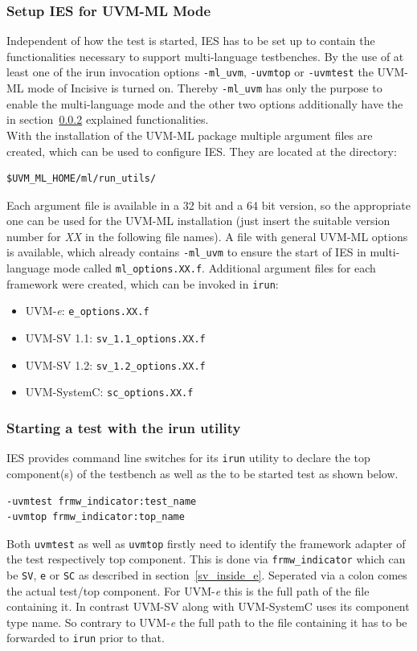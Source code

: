 \subsubsection{Setup IES for UVM-ML Mode}
Independent of how the test is started, IES has to be set up to contain the functionalities necessary to support multi-language testbenches. By the use of at least one of the irun invocation options \lstinline$-ml_uvm$, \lstinline$-uvmtop$ or \lstinline$-uvmtest$ the UVM-ML mode of Incisive is turned on. Thereby \lstinline$-ml_uvm$ has only the purpose to enable the multi-language mode and the other two options additionally have the in section~\ref{uvm_top} explained functionalities.\\
With the installation of the UVM-ML package multiple argument files are created, which can be used to configure IES. They are located at the directory:
\begin{lstlisting}
$UVM_ML_HOME/ml/run_utils/
\end{lstlisting}
Each argument file is available in a 32 bit and a 64 bit version, so the appropriate one can be used for the UVM-ML installation (just insert the suitable version number for \emph{XX} in the following file names). A file with general UVM-ML options is available, which already contains \lstinline$-ml_uvm$ to ensure the start of IES in multi-language mode called \lstinline$ml_options.XX.f$. Additional argument files for each framework were created, which can be invoked in \lstinline$irun$:
\begin{itemize}
  \item UVM-\textit{e}: \lstinline$e_options.XX.f$
  \item UVM-SV 1.1: \lstinline$sv_1.1_options.XX.f$
  \item UVM-SV 1.2: \lstinline$sv_1.2_options.XX.f$
  \item UVM-SystemC: \lstinline$sc_options.XX.f$
\end{itemize}
\subsubsection{Starting a test with the irun utility} \label{uvm_top}
IES provides command line switches for its \lstinline$irun$ utility to declare the top component(s) of the testbench as
well as the to be started test as shown below.
\medskip
{}
\begin{lstlisting}
-uvmtest frmw_indicator:test_name
-uvmtop frmw_indicator:top_name
\end{lstlisting} 
\medskip
Both \lstinline$uvmtest$ as well as \lstinline$uvmtop$ firstly need to identify the framework adapter of the test
respectively top component. This is done via \lstinline$frmw_indicator$ which can be \lstinline$SV$, \lstinline$e$ or
\lstinline$SC$ as described in section~\ref{sv_inside_e}. Seperated via a colon comes the actual test/top component. For
UVM-\textit{e} this is the full path of the file containing it. In contrast UVM-SV along with UVM-SystemC uses
its component type name. So contrary to UVM-\textit{e} the full path to the file containing it has to be forwarded to
\lstinline$irun$ prior to that.

